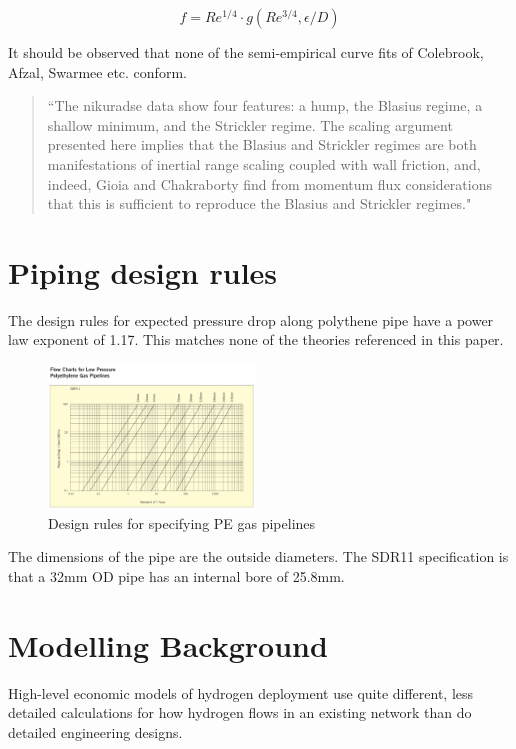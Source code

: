 \documentclass[5p]{elsarticle} %
\begin{document}
\begin{equation}
\label{eqn:goldenfeld}
f =   Re^{1/4} \cdot  g \left( Re^{3/4}, \epsilon/D  \right )
\end{equation}

It should be observed that none of the semi-empirical curve fits of Colebrook, Afzal, Swarmee etc. conform.
\begin{quote}
``The nikuradse
data show four features: a hump, the Blasius regime, a
shallow minimum, and the Strickler regime. The scaling
argument presented here implies that the Blasius and
Strickler regimes are both manifestations of inertial range
scaling coupled with wall friction, and, indeed, Gioia and
Chakraborty\citep{Gioia2006} find from momentum flux considerations that
this is sufficient to reproduce the Blasius and Strickler
regimes."~\cite{Goldenfeld2006}
\end{quote}

\section{Piping design rules}
\label{sec:pipe-rules}

The design rules\citep{GPS2008} for expected pressure drop along polythene pipe have a power law exponent of 1.17. This matches none of the theories referenced in this paper.
\begin{figure}[ht]
\centering
\includegraphics[width=0.49\textwidth]{sdr11-design-rules.png}
\caption{Design rules for specifying PE gas pipelines}
\label{fig:pipe-rules}
\end{figure}

The dimensions of the pipe are the outside diameters. The SDR11 specification is that a 32mm OD pipe has an internal bore of 25.8mm.


\section{Modelling Background} 
High-level economic models of hydrogen deployment use quite different, less detailed calculations for how hydrogen flows in an existing network than do detailed engineering designs.
\end{document}
